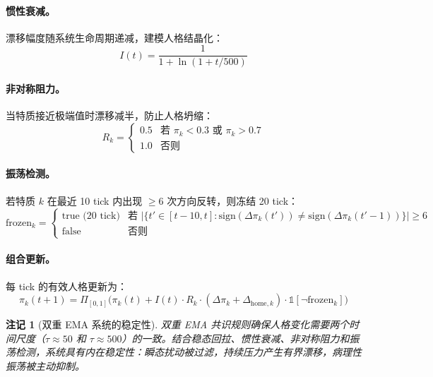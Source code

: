 \documentclass[11pt]{article}
\newtheorem{remark}[theorem]{注记}
\begin{document}
\paragraph{惯性衰减。}
漂移幅度随系统生命周期递减，建模人格结晶化：
\begin{equation}
I(t) = \frac{1}{1 + \ln(1 + t/500)}
\end{equation}

\paragraph{非对称阻力。}
当特质接近极端值时漂移减半，防止人格坍缩：
\begin{equation}
R_k = \begin{cases} 0.5 & \text{若 } \pi_k < 0.3 \text{ 或 } \pi_k > 0.7 \\ 1.0 & \text{否则} \end{cases}
\end{equation}

\paragraph{振荡检测。}
若特质 $k$ 在最近 10 tick 内出现 $\geq 6$ 次方向反转，则冻结 20 tick：
\begin{equation}
\text{frozen}_k = \begin{cases} \text{true (20 tick)} & \text{若 } |\{t' \in [t-10, t] : \text{sign}(\Delta\pi_k(t')) \neq \text{sign}(\Delta\pi_k(t'-1))\}| \geq 6 \\ \text{false} & \text{否则} \end{cases}
\end{equation}

\paragraph{组合更新。}
每 tick 的有效人格更新为：
\begin{equation}
\pi_k(t+1) = \Pi_{[0,1]}\bigl(\pi_k(t) + I(t) \cdot R_k \cdot (\Delta\pi_k + \Delta_{\text{home},k}) \cdot \mathbb{1}[\neg\text{frozen}_k]\bigr)
\end{equation}

\begin{remark}[双重 EMA 系统的稳定性]
双重 EMA 共识规则确保人格变化需要两个时间尺度（$\tau \approx 50$ 和 $\tau \approx 500$）的一致。结合稳态回拉、惯性衰减、非对称阻力和振荡检测，系统具有内在稳定性：瞬态扰动被过滤，持续压力产生有界漂移，病理性振荡被主动抑制。
\end{remark}
\end{document}
